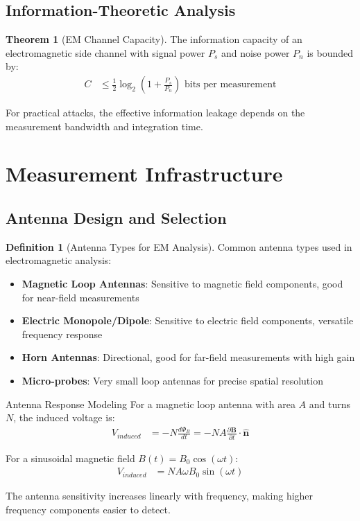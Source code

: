 \documentclass[11pt,a4paper]{article}
\theoremstyle{definition}
\newtheorem{definition}{Definition}[section]
\newtheorem{theorem}{Theorem}[section]
\begin{document}
\subsection{Information-Theoretic Analysis}

\begin{theorem}[EM Channel Capacity]
The information capacity of an electromagnetic side channel with signal power $P_s$ and noise power $P_n$ is bounded by:
\begin{align}
C &\leq \frac{1}{2} \log_2\left(1 + \frac{P_s}{P_n}\right) \text{ bits per measurement}
\end{align}

For practical attacks, the effective information leakage depends on the measurement bandwidth and integration time.
\end{theorem}

\section{Measurement Infrastructure}

\subsection{Antenna Design and Selection}

\begin{definition}[Antenna Types for EM Analysis]
Common antenna types used in electromagnetic analysis:

\begin{itemize}
    \item \textbf{Magnetic Loop Antennas}: Sensitive to magnetic field components, good for near-field measurements
    \item \textbf{Electric Monopole/Dipole}: Sensitive to electric field components, versatile frequency response
    \item \textbf{Horn Antennas}: Directional, good for far-field measurements with high gain
    \item \textbf{Micro-probes}: Very small loop antennas for precise spatial resolution
\end{itemize}
\end{definition}

\begin{mathematicsbox}{Antenna Response Modeling}
For a magnetic loop antenna with area $A$ and turns $N$, the induced voltage is:
\begin{align}
V_{induced} &= -N \frac{d\Phi_B}{dt} = -NA \frac{\partial \mathbf{B}}{\partial t} \cdot \hat{\mathbf{n}}
\end{align}

For a sinusoidal magnetic field $B(t) = B_0 \cos(\omega t)$:
\begin{align}
V_{induced} &= NA\omega B_0 \sin(\omega t)
\end{align}

The antenna sensitivity increases linearly with frequency, making higher frequency components easier to detect.
\end{mathematicsbox}
\end{document}
